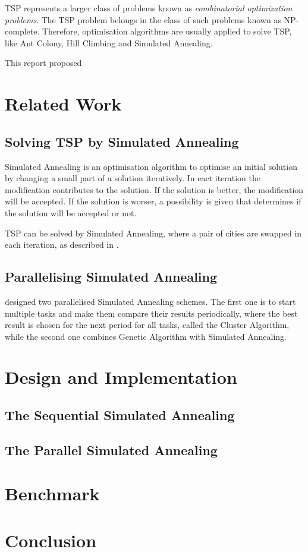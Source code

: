 \documentclass[conference]{IEEEtran}
\begin{document}
TSP represents a larger class of problems known as {\it combinatorial optimization problems}. The TSP problem belongs in the class of such problems known as NP-complete\cite{leeuwen1990handbook}. Therefore, optimisation algorithms are usually applied to solve TSP, like Ant Colony, Hill Climbing and Simulated Annealing\cite{lawler1985traveling}.


This report proposed %

\section{Related Work}

\subsection{Solving TSP by Simulated Annealing}

Simulated Annealing is an optimisation algorithm to optimise an initial solution by changing a small part of a solution iteratively. In eact iteration the modification contributes to the solution. If the solution is better, the modification will be accepted. If the solution is worser, a possibility is given that determines if the solution will be accepted or not\cite{reinelt1994traveling}.

TSP can be solved by Simulated Annealing, where a pair of cities are swapped in each iteration, as described in \cite{reinelt1994traveling}.

\subsection{Parallelising Simulated Annealing}

\cite{ram1996parallel} designed two parallelised Simulated Annealing schemes. The first one is to start multiple tasks and make them compare their results periodically, where the best result is chosen for the next period for all tasks, called the Cluster Algorithm, while the second one combines Genetic Algorithm with Simulated Annealing. 

\section{Design and Implementation}

\subsection{The Sequential Simulated Annealing}

\subsection{The Parallel Simulated Annealing}



\section{Benchmark}

\section{Conclusion}






\end{document}
